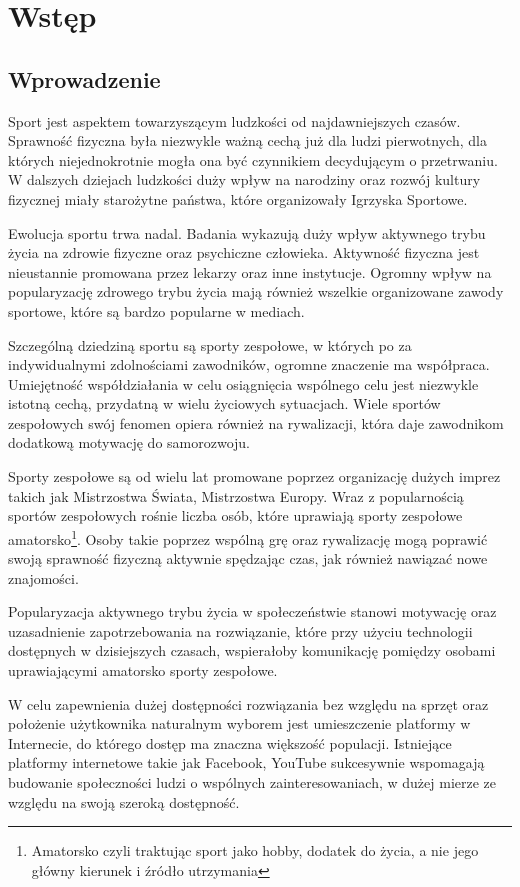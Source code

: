 \chapter{Wstęp}
\section{Wprowadzenie}

Sport jest aspektem towarzyszącym ludzkości od najdawniejszych czasów. Sprawność fizyczna była niezwykle ważną cechą już dla ludzi pierwotnych, dla których niejednokrotnie mogła ona być czynnikiem decydującym o przetrwaniu. W dalszych dziejach ludzkości duży wpływ na narodziny oraz rozwój kultury fizycznej miały starożytne państwa, które organizowały Igrzyska Sportowe.

Ewolucja sportu trwa nadal. Badania wykazują duży wpływ aktywnego trybu życia na zdrowie fizyczne oraz psychiczne człowieka. Aktywność fizyczna jest nieustannie promowana przez lekarzy oraz inne instytucje. Ogromny wpływ na popularyzację zdrowego trybu życia mają również wszelkie organizowane zawody sportowe, które są bardzo popularne w mediach.

Szczególną dziedziną sportu są sporty zespołowe, w których po za indywidualnymi zdolnościami zawodników, ogromne znaczenie ma współpraca. Umiejętność współdziałania w celu osiągnięcia wspólnego celu jest niezwykle istotną cechą, przydatną w wielu życiowych sytuacjach. Wiele sportów zespołowych swój fenomen opiera również na rywalizacji, która daje zawodnikom dodatkową motywację do samorozwoju.

Sporty zespołowe są od wielu lat promowane poprzez organizację dużych imprez takich jak Mistrzostwa Świata, Mistrzostwa Europy. Wraz z popularnością sportów zespołowych rośnie liczba osób, które uprawiają sporty zespołowe amatorsko\footnote{Amatorsko czyli traktując sport jako hobby, dodatek do życia, a nie jego główny kierunek i źródło utrzymania}. Osoby takie poprzez wspólną grę oraz rywalizację mogą poprawić swoją sprawność fizyczną aktywnie spędzając czas, jak również nawiązać nowe znajomości.

Popularyzacja aktywnego trybu życia w społeczeństwie stanowi motywację oraz uzasadnienie zapotrzebowania na rozwiązanie, które przy użyciu technologii dostępnych w dzisiejszych czasach, wspierałoby komunikację pomiędzy osobami uprawiającymi amatorsko sporty zespołowe. 

W celu zapewnienia dużej dostępności rozwiązania bez względu na sprzęt oraz położenie użytkownika naturalnym wyborem jest umieszczenie platformy w Internecie, do którego dostęp ma znaczna większość populacji. Istniejące platformy internetowe takie jak Facebook, YouTube sukcesywnie wspomagają budowanie społeczności ludzi o wspólnych zainteresowaniach, w dużej mierze ze względu na swoją szeroką dostępność.

